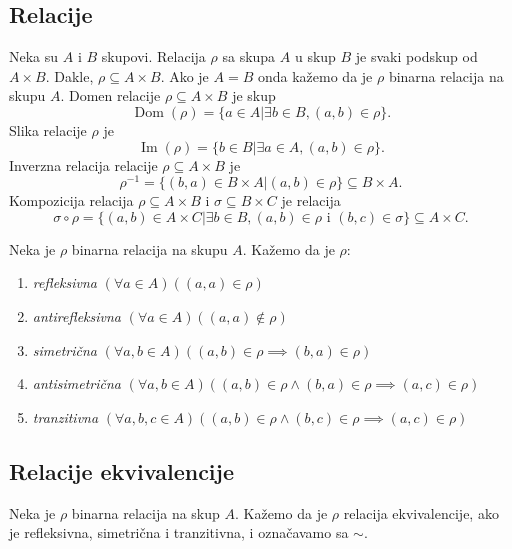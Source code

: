 \documentclass[12p,14paper]{article}
\DeclareMathOperator{\Dom}{Dom}
\DeclareMathOperator{\Ima}{Im}
\begin{document}
\begin{multicols}{2}
\section{Relacije}

    Neka su $A$ i $B$ skupovi. Relacija $\rho$ sa skupa $A$ u skup $B$ je 
    svaki podskup od $A \times B$. Dakle, $\rho \subseteq A \times B$. Ako je 
    $A = B$ onda kažemo da je $\rho$ binarna relacija na skupu $A$.
    Domen relacije $\rho \subseteq A \times B$ je skup
    \[\Dom (\rho) = \{ a \in A | \exists b \in B, (a, b) \in \rho\}.\]
    Slika relacije $\rho$ je
    \[\Ima (\rho) = \{ b \in B | \exists a \in A, (a, b) \in \rho\}.\]
    Inverzna relacija relacije $\rho \subseteq A \times B$ je
    \[
        \rho^{-1} = 
        \{ (b, a) \in B \times A | (a, b) \in \rho\} 
        \subseteq B \times A.
    \]
    Kompozicija relacija $\rho \subseteq A \times B$ i 
    $\sigma \subseteq B \times C$ je relacija
    \[
        \sigma \circ \rho =
        \{ (a,b) \in A \times C | 
        \exists b \in B, (a,b) \in \rho \text{ i } (b,c) \in \sigma\}
        \subseteq A \times C.
    \]

    Neka je $\rho$ binarna relacija na skupu $A$. Kažemo da je $\rho$:
    \begin{enumerate}[]
        \itemsep0em
        \item \textit{refleksivna}
            $(\forall a \in A)((a, a) \in \rho)$
        \item \textit{antirefleksivna}
            $(\forall a \in A)((a, a) \notin \rho)$
        \item \textit{simetrična}
            $(\forall a,b \in A)((a,b) \in \rho \implies (b,a) \in \rho)$
        \item \textit{antisimetrična}
            $(\forall a,b \in A)((a,b) \in \rho \land (b,a) \in \rho 
            \implies (a,c) \in \rho)$
        \item \textit{tranzitivna} 
            $(\forall a,b,c \in A)((a,b) \in \rho \land (b,c) \in \rho 
            \implies (a,c) \in \rho)$
    \end{enumerate}

\subsection{Relacije ekvivalencije}

    Neka je $\rho$ binarna relacija na skup $A$. Kažemo da je $\rho$ relacija 
    ekvivalencije, ako je refleksivna, simetrična i tranzitivna, i označavamo 
    sa $\sim$.


\end{multicols}
\end{document}
